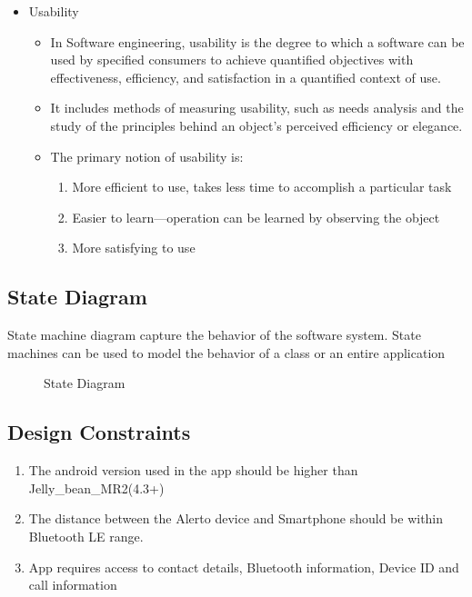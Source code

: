 \documentclass[12pt,a4paper]{report}
\begin{document}
\begin{itemize}
\begin{itemize}
		\item Usability
		\begin{itemize}
			\item In Software engineering, usability is the degree to which a software can be used by specified consumers to achieve quantified objectives with effectiveness, efficiency, and satisfaction in a quantified context of use.
			\item It includes methods of measuring usability, such as needs analysis and the study of the principles behind an object's perceived efficiency or elegance.
		    \item The primary notion of usability is:
			\begin{enumerate}
				 	\item More efficient to use, takes less time to accomplish a particular task
				 	\item Easier to learn—operation can be learned by observing the object
				 	\item More satisfying to use
				 	
				 	
			\end{enumerate}
		\end{itemize}
	\end{itemize}
\end{itemize}

\subsection{State Diagram}
State machine diagram capture the behavior of the software system. State machines can be used to model the behavior of a class or an entire application\\

\begin{figure}[!h]
	\begin{center}
		\caption{State Diagram}
	\end{center}
\end{figure}

\subsection{Design Constraints}
\begin{enumerate}
	\item	The android version used in the app should be higher than Jelly\_bean\_MR2(4.3+)
	\item	The distance between the Alerto device and Smartphone should be within Bluetooth LE range.
	\item	App requires access to contact details, Bluetooth information, Device ID and call information
	
\end{enumerate}
\end{document}
